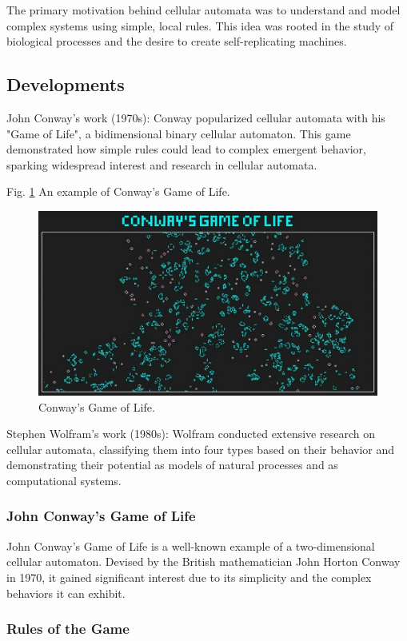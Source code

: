 \documentclass[9pt,a4paper,twoside]{tau-class/tau}
\begin{document}
    The primary motivation behind cellular automata was to understand and model complex
    systems using simple, local rules. This idea was rooted in the study of biological 
    processes and the desire to create self-replicating machines.

    \subsection{Developments}
  
    John Conway's work (1970s): Conway popularized cellular
    automata with his "Game of Life", a bidimensional binary cellular automaton. 
    This game demonstrated how simple rules could lead to complex emergent behavior, 
    sparking widespread interest and research in cellular automata.


    Fig. \ref{fig:figure} An example of Conway's Game of Life.
	\begin{figure}[H]
		\centering
		\includegraphics[width=0.75\columnwidth]{figures/gameOfLife.jpg}
		\caption{Conway's Game of Life.}
		\label{fig:figure}
	\end{figure}

    Stephen Wolfram's work (1980s): Wolfram conducted extensive research on cellular
    automata, classifying them into four types based on their behavior and demonstrating 
    their potential as models of natural processes and as computational systems.
  
    \subsubsection{John Conway's Game of Life}


    John Conway's Game of Life is a well-known example of a two-dimensional cellular automaton. Devised by the British mathematician John Horton Conway in 1970, it gained significant interest due to its simplicity and the complex behaviors it can exhibit.

    \subsubsection{Rules of the Game}
\end{document}

